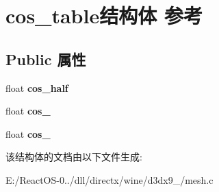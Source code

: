\hypertarget{structcos__table}{}\section{cos\+\_\+table结构体 参考}
\label{structcos__table}
\subsection*{Public 属性}
\begin{DoxyCompactItemize}
\item 
\mbox{\label{structcos__table_a7e36d34fa56a591612a12468cccc009a}} 
float {\bfseries cos\+\_\+half}
\item 
\mbox{\label{structcos__table_af624829d3cc75fb6cef82bd6a1c92aad}} 
float {\bfseries cos\+\_}
\item 
\mbox{\label{structcos__table_a000d9efa09b023116a59efa47b75b2e2}} 
float {\bfseries cos\+\_}
\end{DoxyCompactItemize}


该结构体的文档由以下文件生成\+:\begin{DoxyCompactItemize}
\item 
E\+:/\+React\+O\+S-\/0../dll/directx/wine/d3dx9\+\_/mesh.\+c\end{DoxyCompactItemize}
